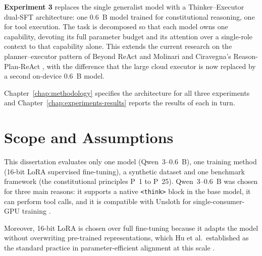 \textbf{Experiment 3} replaces the single generalist model with a Thinker--Executor dual-SFT architecture: one 0.6~B model trained for constitutional reasoning, one for tool execution. The task is decomposed so that each model owns one capability, devoting its full parameter budget and its attention over a single-role context to that capability alone. This extends the current research on the planner--executor pattern of Beyond ReAct \cite{wei2025reactplannercentricframeworkcomplex} and Molinari and Ciravegna's Reason-Plan-ReAct \cite{molinari2025reasonplanreactreasonerplannersupervisingreact}, with the difference that the large cloud executor is now replaced by a second on-device 0.6~B model.

Chapter~\ref{chap:methodology} specifies the architecture for all three experiments and Chapter~\ref{chap:experiments-results} reports the results of each in turn.

\section{Scope and Assumptions}
\label{sec:scope-and-assumptions}

This dissertation evaluates only one model (Qwen~3--0.6~B), one training method (16-bit LoRA supervised fine-tuning), a synthetic dataset and one benchmark framework (the constitutional principles P~1 to P~25). Qwen~3--0.6~B was chosen for three main reasons: it supports a native \texttt{<think>} block in the base model, it can perform tool calls, and it is compatible with Unsloth for single-consumer-GPU training \cite{yang2025qwen3technicalreport}.

Moreover, 16-bit LoRA is chosen over full fine-tuning because it adapts the model without overwriting pre-trained representations, which Hu et al.\ established as the standard practice in parameter-efficient alignment at this scale \cite{hu2021loralowrankadaptationlarge}. 

